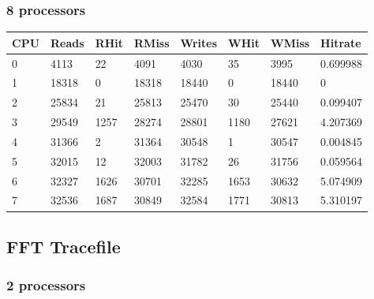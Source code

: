 \documentclass[]{article}
\begin{document}
\subsubsection{8 processors}

\begin{table}[H]
	\begin{tabular}{|l|l|l|l|l|l|l|l|}
		\hline
		\textbf{CPU} & \textbf{Reads} & \textbf{RHit} & \textbf{RMiss} & \textbf{Writes} & \textbf{WHit} & \textbf{WMiss} & \textbf{Hitrate} \\ \hline
		0            & 4113           & 22            & 4091           & 4030            & 35            & 3995           & 0.699988         \\ \hline
		1            & 18318          & 0             & 18318          & 18440           & 0             & 18440          & 0                \\ \hline
		2            & 25834          & 21            & 25813          & 25470           & 30            & 25440          & 0.099407         \\ \hline
		3            & 29549          & 1257          & 28274          & 28801           & 1180          & 27621          & 4.207369         \\ \hline
		4            & 31366          & 2             & 31364          & 30548           & 1             & 30547          & 0.004845         \\ \hline
		5            & 32015          & 12            & 32003          & 31782           & 26            & 31756          & 0.059564         \\ \hline
		6            & 32327          & 1626          & 30701          & 32285           & 1653          & 30632          & 5.074909         \\ \hline
		7            & 32536          & 1687          & 30849          & 32584           & 1771          & 30813          & 5.310197         \\ \hline
	\end{tabular}
\end{table}

\subsection{FFT Tracefile}

\subsubsection{2 processors}
\end{document}
